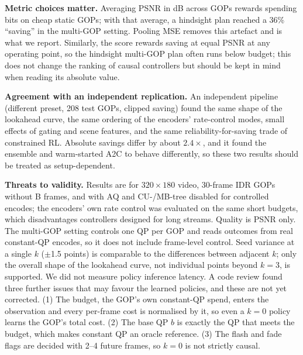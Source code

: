 \documentclass[conference]{IEEEtran}
\begin{document}
\textbf{Metric choices matter.} Averaging PSNR in dB across GOPs rewards spending bits on cheap static GOPs; with that average, a hindsight plan reached a 36\% ``saving'' in the multi-GOP setting. Pooling MSE removes this artefact and is what we report. Similarly, the score rewards saving at equal PSNR at any operating point, so the hindsight multi-GOP plan often runs below budget; this does not change the ranking of causal controllers but should be kept in mind when reading its absolute value.

\textbf{Agreement with an independent replication.} An independent pipeline (different preset, 208 test GOPs, clipped saving) found the same shape of the lookahead curve, the same ordering of the encoders' rate-control modes, small effects of gating and scene features, and the same reliability-for-saving trade of constrained RL. Absolute savings differ by about $2.4\times$, and it found the ensemble and warm-started A2C to behave differently, so these two results should be treated as setup-dependent.

\textbf{Threats to validity.} Results are for $320{\times}180$ video, 30-frame IDR GOPs without B frames, and with AQ and CU-/MB-tree disabled for controlled encodes; the encoders' own rate control was evaluated on the same short budgets, which disadvantages controllers designed for long streams. Quality is PSNR only. The multi-GOP setting controls one QP per GOP and reads outcomes from real constant-QP encodes, so it does not include frame-level control. Seed variance at a single $k$ ($\pm$1.5 points) is comparable to the differences between adjacent $k$; only the overall shape of the lookahead curve, not individual points beyond $k{=}3$, is supported. We did not measure policy inference latency. A code review found three further issues that may favour the learned policies, and these are not yet corrected. (1) The budget, the GOP's own constant-QP spend, enters the observation and every per-frame cost is normalised by it, so even a $k{=}0$ policy learns the GOP's total cost. (2) The base QP $b$ is exactly the QP that meets the budget, which makes constant QP an oracle reference. (3) The flash and fade flags are decided with 2--4 future frames, so $k{=}0$ is not strictly causal.

\end{document}

